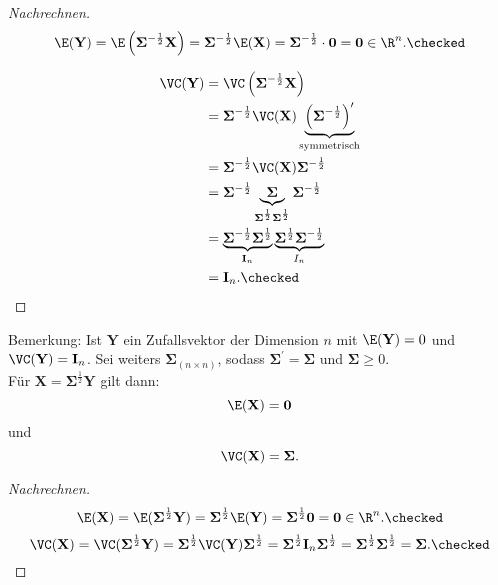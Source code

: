 \documentclass{tstextbook}
\begin{document}
	\begin{proof}[Nachrechnen]
	
	\[ \E(\textbf{Y}) = \E\left(\boldsymbol{\Sigma}^{-\frac{1}{2}} \textbf{X}\right) = \boldsymbol{\Sigma}^{-\frac{1}{2}} \E(\textbf{X}) = \boldsymbol{\Sigma}^{-\frac{1}{2}} \cdot \boldsymbol{0} = \boldsymbol{0} \in \R^n. \checked \]
	
	\[ 
	\begin{aligned}
		\VC(\textbf{Y}) & = \VC\left(\boldsymbol{\Sigma}^{-\frac{1}{2}}\textbf{X}\right) \\
		& = \boldsymbol{\Sigma}^{-\frac{1}{2}} \VC(\textbf{X}) \underbrace{\left(\boldsymbol{\Sigma}^{-\frac{1}{2}}\right)^\prime}_{\text{symmetrisch}} \\
		& = \boldsymbol{\Sigma}^{-\frac{1}{2}} \VC(\textbf{X}) \boldsymbol{\Sigma}^{-\frac{1}{2}} \\
		& = \boldsymbol{\Sigma}^{-\frac{1}{2}} \underbrace{\boldsymbol{\Sigma}}_{\boldsymbol{\Sigma}^{\frac{1}{2}}\boldsymbol{\Sigma}^{\frac{1}{2}}} \boldsymbol{\Sigma}^{-\frac{1}{2}} \\
		& = \underbrace{\boldsymbol{\Sigma}^{-\frac{1}{2}} \boldsymbol{\Sigma}^{\frac{1}{2}}}_{\textbf{I}_n} \underbrace{\boldsymbol{\Sigma}^{\frac{1}{2}} \boldsymbol{\Sigma}^{-\frac{1}{2}}}_{I_n} \\
		& = \textbf{I}_n. \checked
	\end{aligned}
	\]		
	\end{proof}

	\begin{remark}
		Bemerkung: Ist $ \textbf{Y} $ ein Zufallsvektor der Dimension $ n $ mit $ \E(\textbf{Y}) = 0 $ und $ \VC(\textbf{Y}) = \textbf{I}_n $. Sei weiters $ \boldsymbol{\Sigma}_{(n \times n)} $, sodass $ \boldsymbol{\Sigma}^\prime = \boldsymbol{\Sigma} $ und $ \boldsymbol{\Sigma} \ge 0 $. \\
		Für $ \textbf{X} = \boldsymbol{\Sigma}^{\frac{1}{2}} \textbf{Y} $ gilt dann: \[ \E(\textbf{X}) = \boldsymbol{0} \] und \[ \VC(\textbf{X}) = \boldsymbol{\Sigma}. \]
	\end{remark}
	
	\begin{proof}[Nachrechnen]
		\[
		\E(\textbf{X}) = \E(\boldsymbol{\Sigma}^{\frac{1}{2}} \textbf{Y}) = \boldsymbol{\Sigma}^{\frac{1}{2}} \E(\textbf{Y}) = \boldsymbol{\Sigma}^{\frac{1}{2}} \boldsymbol{0} = \boldsymbol{0} \in \R^n. \checked
		\]
		\[ \VC(\textbf{X}) = \VC(\boldsymbol{\Sigma}^{\frac{1}{2}} \textbf{Y}) = \boldsymbol{\Sigma}^{\frac{1}{2}} \VC(\textbf{Y}) \boldsymbol{\Sigma}^{\frac{1}{2}} = \boldsymbol{\Sigma}^{\frac{1}{2}} \textbf{I}_n \boldsymbol{\Sigma}^{\frac{1}{2}} = \boldsymbol{\Sigma}^{\frac{1}{2}} \boldsymbol{\Sigma}^{\frac{1}{2}} = \boldsymbol{\Sigma}. \checked \]
	\end{proof}
	
\end{document}

